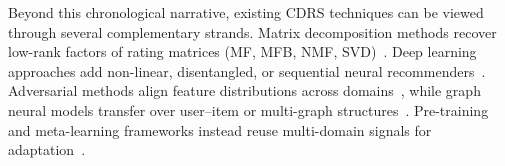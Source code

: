 \documentclass[pdflatex,sn-mathphys-num]{sn-jnl}%
\theoremstyle{thmstyleone}%
\theoremstyle{thmstyletwo}%
\theoremstyle{thmstylethree}%
\begin{document}
Beyond this chronological narrative, existing CDRS techniques can be viewed through several complementary strands. Matrix decomposition methods recover low-rank factors of rating matrices (MF, MFB, NMF, SVD)~\cite{koren2009matrix,lee2000algorithms,sarwar2002incremental,patel2025enhanced,patel2025enhancedNMF}. Deep learning approaches add non-linear, disentangled, or sequential neural recommenders~\cite{xue2017deep,he2017neural,cao2022disencdr,ma2024triple,chen2025recurrent,wang2025hierarchical,patel2026adaptive,meng2025heterogeneous}. Adversarial methods align feature distributions across domains~\cite{li2022adversarial,kong2024dadin,su2024cross}, while graph neural models transfer over user--item or multi-graph structures~\cite{zhao2025cross,gao2025disentangled,he2020lightgcn,shu2024self}. Pre-training and meta-learning frameworks instead reuse multi-domain signals for adaptation~\cite{wang2025mf,zhu2025mimnet}.
\end{document}
